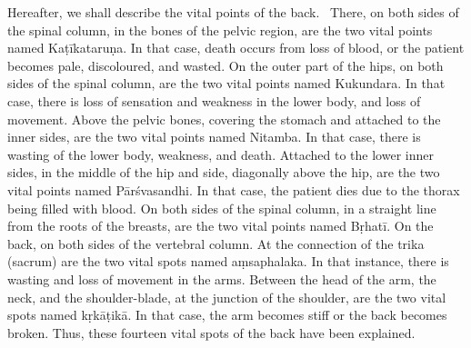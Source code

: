 \begin{translation}
\begin{tt}
\item[26]
Hereafter, we shall describe the vital points of the back. 
There, on both sides of the spinal column, in the bones of the pelvic region, are the two vital points named Kaṭīkataruṇa.
In that case, death occurs from loss of blood, or the patient becomes pale, discoloured, and wasted.
On the outer part of the hips, on both sides of the spinal column, are the two vital points named Kukundara.
In that case, there is loss of sensation and weakness in the lower body, and loss of movement.
Above the pelvic bones, covering the stomach and attached to the inner sides, are the two vital points named Nitamba.
In that case, there is wasting of the lower body, weakness, and death.
Attached to the lower inner sides, in the middle of the hip and side, diagonally above the hip, are the two vital points named Pārśvasandhi.
In that case, the patient dies due to the thorax being filled with blood.
On both sides of the spinal column, in a straight line from the roots of the breasts, are the two vital points named Bṛhatī.
On the back, on both sides of the vertebral column.
At the connection of the trika (sacrum) are the two vital spots named aṃsaphalaka.
In that instance, there is wasting and loss of movement in the arms.
Between the head of the arm, the neck, and the shoulder-blade, at the junction of the shoulder, are the two vital spots named kṛkāṭikā.
In that case, the arm becomes stiff or the back becomes broken.
Thus, these fourteen vital spots of the back have been explained.
\item[27]


\end{tt}
\end{translation}
